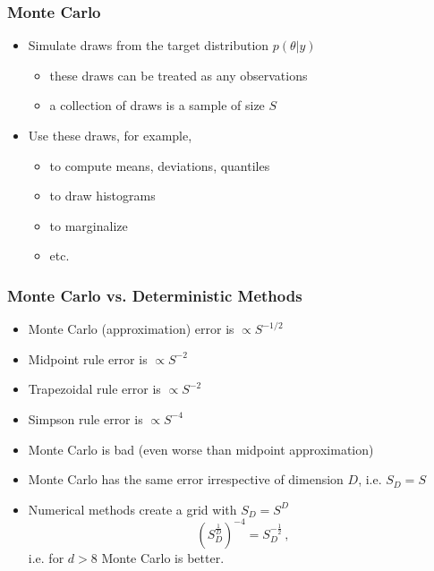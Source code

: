 \documentclass[10pt]{beamer}
\begin{document}
\begin{frame}

\frametitle{Monte Carlo}

  \begin{itemize}
  \item Simulate draws from the target distribution $p(\theta|y)$
    \begin{itemize}
    \item these draws can be treated as any observations
    \item a collection of draws is a sample of size $S$
    \end{itemize}
  \item Use these draws, for example,
    \begin{itemize}
    \item to compute means, deviations, quantiles
    \item to draw histograms
    \item to marginalize
    \item etc.
    \end{itemize}
  \end{itemize}

\end{frame}

\begin{frame}


\frametitle{Monte Carlo vs. Deterministic Methods}

  \begin{itemize}
  \item Monte Carlo (approximation) error is $\propto S^{-1/2}$
  \item Midpoint rule error is $\propto S^{-2}$
  \item Trapezoidal rule error is $\propto S^{-2}$
  \item Simpson rule error is $\propto S^{-4}$
  \item Monte Carlo is bad (even worse than midpoint approximation)
  \pause
  \item Monte Carlo has the same error irrespective of dimension $D$, i.e. $S_D = S$
  \item Numerical methods create a grid with $S_D = S^D$
  \pause
  \[
  (S_D^\frac{1}{D})^{-4} = S_D^{-\frac{1}{2}}\,,
  \]
  i.e. for $d > 8$ Monte Carlo is better.
  \end{itemize}

\end{frame}
\end{document}
